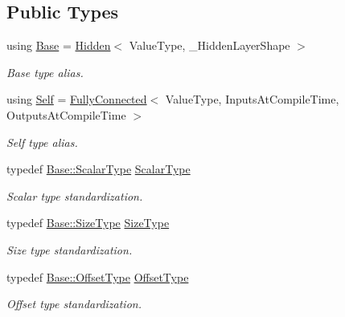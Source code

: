 \subsection*{Public Types}
\begin{DoxyCompactItemize}
\item 
using \hyperlink{classffnn_1_1layer_1_1_fully_connected_ad49d4e88823497be658d01c44eeef3f2}{Base} = \hyperlink{classffnn_1_1layer_1_1_hidden}{Hidden}$<$ Value\-Type, \-\_\-\-Hidden\-Layer\-Shape $>$
\begin{DoxyCompactList}\small\item\em Base type alias. \end{DoxyCompactList}\item 
using \hyperlink{classffnn_1_1layer_1_1_fully_connected_ac41b1867a1a4e8c9c9eaa892db2ab805}{Self} = \hyperlink{classffnn_1_1layer_1_1_fully_connected}{Fully\-Connected}$<$ Value\-Type, Inputs\-At\-Compile\-Time, Outputs\-At\-Compile\-Time $>$
\begin{DoxyCompactList}\small\item\em Self type alias. \end{DoxyCompactList}\item 
typedef \hyperlink{classffnn_1_1layer_1_1_layer_a3d482813f86f1ec69554b4592c478c32}{Base\-::\-Scalar\-Type} \hyperlink{classffnn_1_1layer_1_1_fully_connected_aa5e1875ec3ea63c90655419e7dd32a55}{Scalar\-Type}
\begin{DoxyCompactList}\small\item\em Scalar type standardization. \end{DoxyCompactList}\item 
typedef \hyperlink{classffnn_1_1layer_1_1_hidden_ac148012cb544a39841675601090cd4c8}{Base\-::\-Size\-Type} \hyperlink{classffnn_1_1layer_1_1_fully_connected_a2924c85b3cc3e79db3f271cd22cac32c}{Size\-Type}
\begin{DoxyCompactList}\small\item\em Size type standardization. \end{DoxyCompactList}\item 
typedef \hyperlink{classffnn_1_1layer_1_1_hidden_ae2409b970adafb0ebc9b2eec62c4aac4}{Base\-::\-Offset\-Type} \hyperlink{classffnn_1_1layer_1_1_fully_connected_a0f5ae1a0bd038f404410ce2af1054833}{Offset\-Type}
\begin{DoxyCompactList}\small\item\em Offset type standardization. \end{DoxyCompactList}\item 

\end{DoxyCompactItemize}
